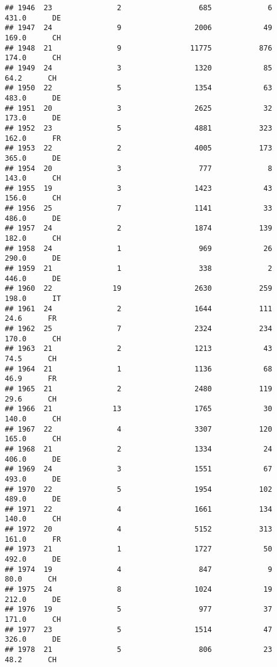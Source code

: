\documentclass[
]{article}
\begin{document}
\begin{verbatim}
## 1946  23               2                  685             6    431.0      DE
## 1947  24               9                 2006            49    169.0      CH
## 1948  21               9                11775           876    174.0      CH
## 1949  24               3                 1320            85     64.2      CH
## 1950  22               5                 1354            63    483.0      DE
## 1951  20               3                 2625            32    173.0      DE
## 1952  23               5                 4881           323    162.0      FR
## 1953  22               2                 4005           173    365.0      DE
## 1954  20               3                  777             8    143.0      CH
## 1955  19               3                 1423            43    156.0      CH
## 1956  25               7                 1141            33    486.0      DE
## 1957  24               2                 1874           139    182.0      CH
## 1958  24               1                  969            26    290.0      DE
## 1959  21               1                  338             2    446.0      DE
## 1960  22              19                 2630           259    198.0      IT
## 1961  24               2                 1644           111     24.6      FR
## 1962  25               7                 2324           234    170.0      CH
## 1963  21               2                 1213            43     74.5      CH
## 1964  21               1                 1136            68     46.9      FR
## 1965  21               2                 2480           119     29.6      CH
## 1966  21              13                 1765            30    140.0      CH
## 1967  22               4                 3307           120    165.0      CH
## 1968  21               2                 1334            24    406.0      DE
## 1969  24               3                 1551            67    493.0      DE
## 1970  22               5                 1954           102    489.0      DE
## 1971  22               4                 1661           134    140.0      CH
## 1972  20               4                 5152           313    161.0      FR
## 1973  21               1                 1727            50    492.0      DE
## 1974  19               4                  847             9     80.0      CH
## 1975  24               8                 1024            19    212.0      DE
## 1976  19               5                  977            37    171.0      CH
## 1977  23               5                 1514            47    326.0      DE
## 1978  21               5                  806            23     48.2      CH

\end{verbatim}
\end{document}
